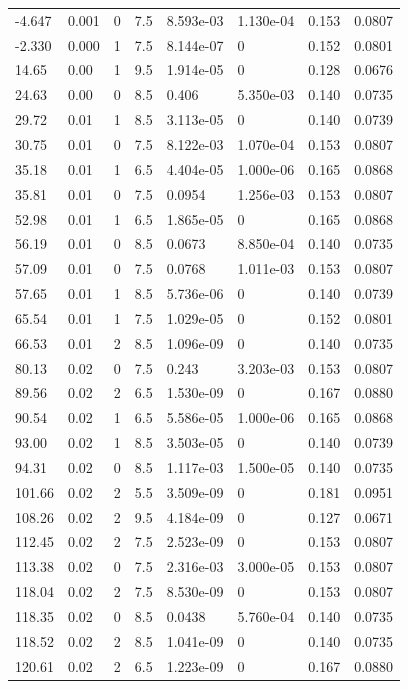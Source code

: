 \documentclass[preview]{standalone}
\begin{document}
{{\begin{tabular}{L{1.2cm}C{1.2cm} C{0.3cm}C{0.5cm} C{1.4cm}C{1.4cm} C{1.4cm}C{1.4cm}}
  -4.647  &  0.001  & 0     & 7.5 &  8.593e-03  & 1.130e-04  & 0.153 &  0.0807   \\ 
  -2.330  &  0.000  & 1     & 7.5 &  8.144e-07  & 0  & 0.152 &  0.0801   \\ 
  14.65  &  0.00  & 1     & 9.5 &  1.914e-05  & 0  & 0.128 &  0.0676   \\ 
  24.63  &  0.00  & 0     & 8.5 &  0.406  & 5.350e-03  & 0.140 &  0.0735   \\ 
  29.72  &  0.01  & 1     & 8.5 &  3.113e-05  & 0  & 0.140 &  0.0739   \\ 
  30.75  &  0.01  & 0     & 7.5 &  8.122e-03  & 1.070e-04  & 0.153 &  0.0807   \\ 
  35.18  &  0.01  & 1     & 6.5 &  4.404e-05  & 1.000e-06  & 0.165 &  0.0868   \\ 
  35.81  &  0.01  & 0     & 7.5 &  0.0954  & 1.256e-03  & 0.153 &  0.0807   \\ 
  52.98  &  0.01  & 1     & 6.5 &  1.865e-05  & 0  & 0.165 &  0.0868   \\ 
  56.19  &  0.01  & 0     & 8.5 &  0.0673  & 8.850e-04  & 0.140 &  0.0735   \\ 
  57.09  &  0.01  & 0     & 7.5 &  0.0768  & 1.011e-03  & 0.153 &  0.0807   \\ 
  57.65  &  0.01  & 1     & 8.5 &  5.736e-06  & 0  & 0.140 &  0.0739   \\ 
  65.54  &  0.01  & 1     & 7.5 &  1.029e-05  & 0  & 0.152 &  0.0801   \\ 
  66.53  &  0.01  & 2     & 8.5 &  1.096e-09  & 0  & 0.140 &  0.0735   \\ 
  80.13  &  0.02  & 0     & 7.5 &  0.243  & 3.203e-03  & 0.153 &  0.0807   \\ 
  89.56  &  0.02  & 2     & 6.5 &  1.530e-09  & 0  & 0.167 &  0.0880   \\ 
  90.54  &  0.02  & 1     & 6.5 &  5.586e-05  & 1.000e-06  & 0.165 &  0.0868   \\ 
  93.00  &  0.02  & 1     & 8.5 &  3.503e-05  & 0  & 0.140 &  0.0739   \\ 
  94.31  &  0.02  & 0     & 8.5 &  1.117e-03  & 1.500e-05  & 0.140 &  0.0735   \\ 
  101.66  &  0.02  & 2     & 5.5 &  3.509e-09  & 0  & 0.181 &  0.0951   \\ 
  108.26  &  0.02  & 2     & 9.5 &  4.184e-09  & 0  & 0.127 &  0.0671   \\ 
  112.45  &  0.02  & 2     & 7.5 &  2.523e-09  & 0  & 0.153 &  0.0807   \\ 
  113.38  &  0.02  & 0     & 7.5 &  2.316e-03  & 3.000e-05  & 0.153 &  0.0807   \\ 
  118.04  &  0.02  & 2     & 7.5 &  8.530e-09  & 0  & 0.153 &  0.0807   \\ 
  118.35  &  0.02  & 0     & 8.5 &  0.0438  & 5.760e-04  & 0.140 &  0.0735   \\ 
  118.52  &  0.02  & 2     & 8.5 &  1.041e-09  & 0  & 0.140 &  0.0735   \\ 
  120.61  &  0.02  & 2     & 6.5 &  1.223e-09  & 0  & 0.167 &  0.0880   \\ 
\hline 
\end{tabular} 

}}
\end{document}
